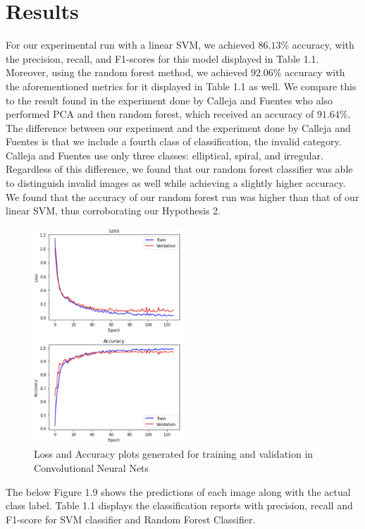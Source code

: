 \section{Results}

For our experimental run with a linear SVM, we achieved $86.13 \%$ accuracy, with the precision, recall, and F1-scores for this model displayed in Table 1.1. Moreover, using the random forest method, we achieved $92.06 \%$ accuracy with the aforementioned metrics for it displayed in Table 1.1 as well. We compare this to the result found in the experiment done by Calleja and Fuentes who also performed PCA and then random forest, which received an accuracy of $91.64 \%$. The difference between our experiment and the experiment done by Calleja and Fuentes is that we include a fourth class of classification, the invalid category. Calleja and Fuentes use only three classes: elliptical, spiral, and irregular. Regardless of this difference, we found that our random forest classifier was able to distinguish invalid images as well while achieving a slightly higher accuracy. We found that the accuracy of our random forest run was higher than that of our linear SVM, thus corroborating our Hypothesis 2.

\begin{figure}[H]
    \centering
    \includegraphics[width=0.5\textwidth]{Images/loss-accuracy-cnn.png}
    \caption{Loss and Accuracy plots generated for training and validation in Convolutional Neural Nets}
\end{figure}

The below Figure 1.9 shows the predictions of each image along with the actual class label. Table 1.1 displays the classification reports with precision, recall and F1-score for SVM classifier and Random Forest Classifier.

